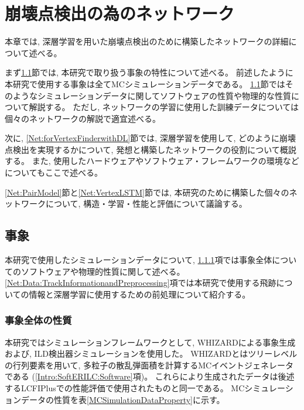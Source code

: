 
\chapter{崩壊点検出の為のネットワーク} \label{chap:Networks}

本章では, 深層学習を用いた崩壊点検出のために構築したネットワークの詳細について述べる。

まず\ref{Net:Data}節では, 本研究で取り扱う事象の特性について述べる。
前述したように本研究で使用する事象は全てMCシミュレーションデータである。
\ref{Net:Data}節ではそのようなシミュレーションデータに関してソフトウェアの性質や物理的な性質について解説する。
ただし, ネットワークの学習に使用した訓練データについては個々のネットワークの解説で適宜述べる。

次に, \ref{Net:forVertexFinderwithDL}節では, 深層学習を使用して, どのように崩壊点検出を実現するかについて, 発想と構築したネットワークの役割について概説する。
また, 使用したハードウェアやソフトウェア・フレームワークの環境などについてもここで述べる。

\ref{Net:PairModel}節と\ref{Net:VertexLSTM}節では, 本研究のために構築した個々のネットワークについて, 構造・学習・性能と評価について議論する。


\section{事象} \label{Net:Data}

本研究で使用したシミュレーションデータについて, \ref{Net:Data:DataProperty}項では事象全体についてのソフトウェアや物理的性質に関して述べる。
\ref{Net:Data:TrackInformationandPreprocessing}項では本研究で使用する飛跡についての情報と深層学習に使用するための前処理について紹介する。


\subsection{事象全体の性質} \label{Net:Data:DataProperty}

本研究ではシミュレーションフレームワークとして, WHIZARD\cite{WHIZARDpaper}による事象生成および, ILD検出器シミュレーションを使用した。
WHIZARDとはツリーレベルの行列要素を用いて, 多粒子の散乱弾面積を計算するMCイベントジェネレータである (\ref{Intro:SoftERILC:Software}項)。
これらにより生成されたデータは後述するLCFIPlusでの性能評価\cite{LCFIPlusPaper}で使用されたものと同一である。
MCシミュレーションデータの性質を表\ref{MCSimulationDataProperty}に示す。


